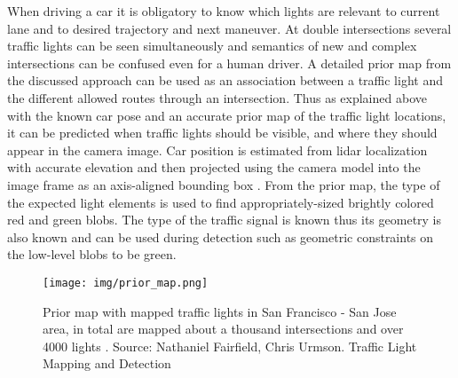 \documentclass[letterpaper, 10 pt, conference]{ieeeconf} %
\begin{document}
When driving a car it is obligatory to know which lights are relevant to current lane and to desired trajectory and next maneuver. At double intersections several traffic lights can be seen simultaneously and semantics of new and complex intersections can be confused even for a human driver. A detailed prior map from the discussed approach can be used as an association between a traffic light and the different allowed routes through an intersection. Thus as explained above with the known car pose and an accurate prior map of the traffic light locations, it can be predicted when traffic lights should be visible, and where they should appear in the camera image. Car position is estimated from lidar localization with accurate elevation and then projected using the camera model into the image frame as an axis-aligned bounding box \cite{c5}. From the prior map, the type of the expected light elements is used to find appropriately-sized brightly colored red and green blobs. The type of the traffic signal is known thus its geometry is also known and can be used during detection such as geometric constraints on the low-level blobs to be green. 

\begin{figure}[thpb]
	\centering
	\texttt{[image: img/prior\_map.png]}
	\caption{Prior map with mapped traffic lights in San Francisco - San Jose area, in total are mapped about a thousand intersections and over 4000 lights . Source: Nathaniel Fairfield, Chris Urmson. Traffic Light Mapping and Detection} 
	\label{prior_map}
\end{figure}
\end{document}
